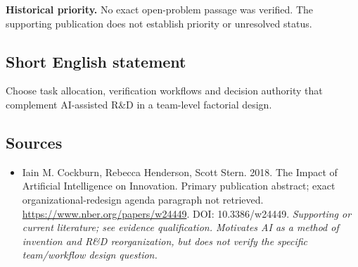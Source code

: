 \documentclass[11pt]{article}
\begin{document}
\par\textbf{Historical priority.} No exact open-problem passage was verified. The supporting publication does not establish priority or unresolved status.

\subsection{Short English statement}
Choose task allocation, verification workflows and decision authority that complement AI-assisted R\&D in a team-level factorial design.

\subsection{Sources}
\begin{itemize}\raggedright
\item[\textnormal{[S1]}]\hypertarget{source:30007696:1}{} Iain M. Cockburn, Rebecca Henderson, Scott Stern. 2018. The Impact of Artificial Intelligence on Innovation. Primary publication abstract; exact organizational-redesign agenda paragraph not retrieved.
\url{https://www.nber.org/papers/w24449}.
DOI: 10.3386/w24449.
{\small\textit{Supporting or current literature; see evidence qualification. Motivates AI as a method of invention and R\&D reorganization, but does not verify the specific team/workflow design question.}}
\end{itemize}
\end{document}
